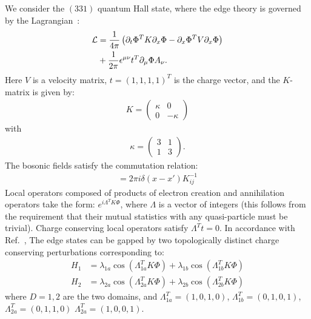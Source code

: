 \documentclass[twocolumn,aps,prb,showpacs]{revtex4-1}
\begin{document}
We consider the  $(331)$ quantum Hall state, where the edge theory is governed by the Lagrangian~\cite{Wen1990,Lee1991,Levin2012}:
\begin{align}
\nonumber
{\cal L} &= \frac{1}{4\pi}\left(\partial_t \Phi^TK \partial_x\Phi-\partial_x \Phi^TV\partial_x\Phi\right)\\
&+\frac{1}{2\pi}\epsilon^{\mu\nu}t^T\partial_\mu\Phi A_\nu.
\end{align}
Here $ V$ is a velocity matrix, $ t=(1,1,1,1)^T$ is the charge vector, and the $K$-matrix  is given by:
\begin{align}
K= \left(
\begin{array}{ccc}
  \kappa & 0    \\
  0&-\kappa
\end{array}
\right)
\end{align}
with
\begin{align}
\kappa =\left(
\begin{array}{ccc}
3  & 1    \\
  1& 3
\end{array}
\right).
\end{align}
The bosonic fields satisfy the commutation relation:
\begin{align}
[\partial_x\Phi_i(x),\Phi_j(x')]=2\pi i \delta(x-x')K^{-1}_{ij}
\end{align}
Local operators composed of products of electron creation and annihilation operators take the form: $e^{i\Lambda^TK\Phi} $, where $\Lambda $ is a vector of integers (this follows from the requirement that their mutual statistics with any quasi-particle must be trivial). Charge conserving local operators satisfy $\Lambda^T t =0$. In accordance with Ref.~, The edge states can be gapped by two topologically distinct charge conserving perturbations corresponding to:
\begin{align}
H_{1} &= \lambda_{1a}\cos\left(\Lambda_{1a}^TK\Phi\right)+ \lambda_{1b}\cos\left(\Lambda_{1b}^TK\Phi\right)\\
H_{2} &= \lambda_{2a}\cos\left(\Lambda_{2a}^TK\Phi\right)+ \lambda_{2b}\cos\left(\Lambda_{2b}^TK\Phi\right)
\end{align}
where $D=1,2 $ are the two domains, and $\Lambda_{1a}^T = (1,0,1,0)$,  $\Lambda_{1b}^T = (0,1,0,1)$, $\Lambda_{2a}^T = (0,1,1,0)$ $\Lambda_{2a}^T = (1,0,0,1)$.
\end{document}
